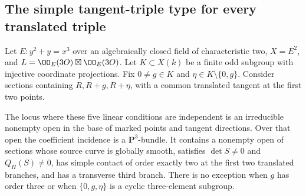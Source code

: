 \subsection{The simple tangent-triple type for every translated triple}
\label{sec:DE-A4-uniform-tangent-triple-type}

\begin{lemma}
\label{lem:DE-A4-uniform-triple-local-type}
Let $E:y^2+y=x^3$ over an algebraically closed field of
characteristic two, $X=E^2$, and
$L=\OO_E(3O)\boxtimes\OO_E(3O)$.
Let $K\subset X(k)$ be a finite odd subgroup with injective
coordinate projections.  Fix $0\ne g\in K$ and
$\eta\in K\setminus\{0,g\}$.
Consider sections containing $R,R+g,R+\eta$, with a common translated
tangent at the first two points.

The locus where these five linear conditions are independent is
an irreducible nonempty open in the base of marked points and
tangent directions.  Over that open the coefficient incidence is
a $\mathbf P^3$-bundle.  It contains a nonempty open of sections
whose source curve is globally smooth, satisfies
$\det S\ne0$ and $Q_H(S)\ne0$, has simple contact of order exactly
two at the first two translated branches, and has a transverse
third branch.
There is no exception when $g$ has order three or when
$\{0,g,\eta\}$ is a cyclic three-element subgroup.
\end{lemma}
